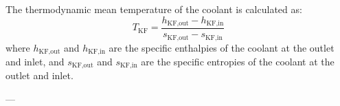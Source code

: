 The thermodynamic mean temperature of the coolant is calculated as:  
\[
T_{\text{KF}} = \frac{h_{\text{KF,out}} - h_{\text{KF,in}}}{s_{\text{KF,out}} - s_{\text{KF,in}}}
\]  
where \( h_{\text{KF,out}} \) and \( h_{\text{KF,in}} \) are the specific enthalpies of the coolant at the outlet and inlet, and \( s_{\text{KF,out}} \) and \( s_{\text{KF,in}} \) are the specific entropies of the coolant at the outlet and inlet.

---